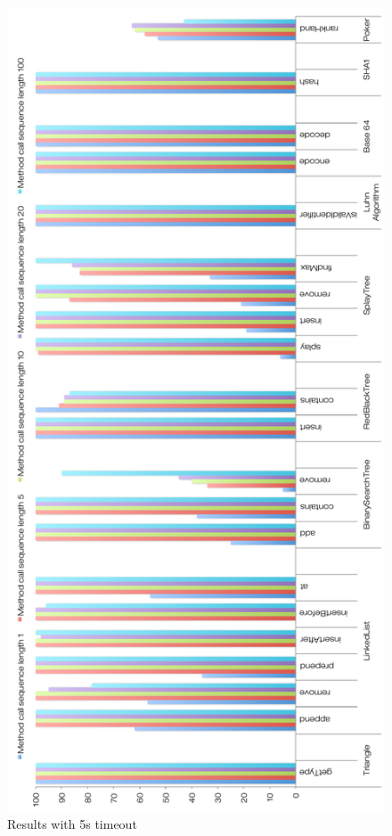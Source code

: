 \begin{figure}[h]
\vspace*{-2.5cm}
\centering
\includegraphics[scale=0.56]{./components/chapter7/5sr.pdf}
\caption{Results with 5s timeout}
\label{5s}
\end{figure}

